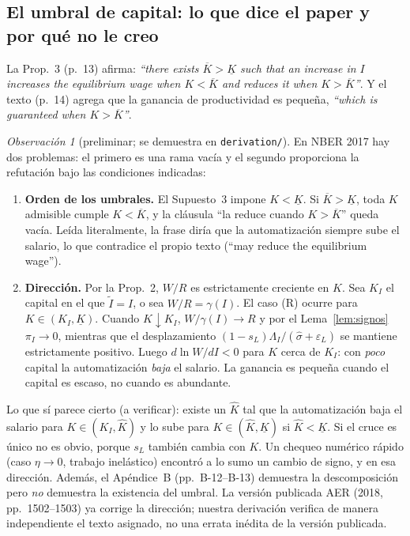 \documentclass[11pt,a4paper]{article}
\theoremstyle{definition}
\theoremstyle{plain}
\theoremstyle{remark}
\newtheorem{observacion}[definicion]{Observación}
\numberwithin{equation}{section}
\newcommand{\sh}{\hat\sigma}
\newcommand{\It}{\tilde I}
\newcommand{\Kl}{\underline K}
\newcommand{\Kb}{\overline K}
\newcommand{\eps}{\varepsilon}
\begin{document}
\subsection{El umbral de capital: lo que dice el paper y por qué no le creo}
La Prop.~3 (p.~13) afirma: \emph{``there exists $\Kb>\Kl$ such that an increase in $I$ increases the equilibrium wage
when $K<\Kb$ and reduces it when $K>\Kb$''}. Y el texto (p.~14) agrega que la ganancia de productividad es pequeña,
\emph{``which is guaranteed when $K>\Kb$''}.

\begin{observacion}[preliminar; se demuestra en \texttt{derivation/}]\label{obs:umbral}
En NBER 2017 hay dos problemas: el primero es una rama vacía y el segundo proporciona la refutación bajo las condiciones indicadas:
\begin{enumerate}[nosep]
  \item \textbf{Orden de los umbrales.} El Supuesto~3 impone $K<\Kl$. Si $\Kb>\Kl$, toda $K$ admisible cumple $K<\Kb$,
        y la cláusula ``la reduce cuando $K>\Kb$'' queda vacía. Leída literalmente, la frase diría que la
        automatización siempre sube el salario, lo que contradice el propio texto (``may reduce the equilibrium wage'').
  \item \textbf{Dirección.} Por la Prop.~2, $W/R$ es estrictamente creciente en $K$. Sea $K_I$ el capital en el que
        $\It=I$, o sea $W/R=\gamma(I)$. El caso (R) ocurre para $K\in(K_I,\Kl)$. Cuando $K\downarrow K_I$,
        $W/\gamma(I)\to R$ y por el Lema~\ref{lem:signos} $\pi_I\to0$, mientras que el desplazamiento
        $(1-s_L)\Lambda_I/(\sh+\eps_L)$ se mantiene estrictamente positivo. Luego $d\ln W/dI<0$ para $K$ cerca de $K_I$:
        con \emph{poco} capital la automatización \emph{baja} el salario. La ganancia es pequeña cuando el capital es
        escaso, no cuando es abundante.
\end{enumerate}
Lo que sí parece cierto (a verificar): existe un $\hat K$ tal que la automatización baja el salario para
$K\in(K_I,\hat K)$ y lo sube para $K\in(\hat K,\Kl)$ si $\hat K<\Kl$. Si el cruce es único no es obvio, porque $s_L$
también cambia con $K$. Un chequeo numérico rápido (caso $\eta\to0$, trabajo inelástico) encontró a lo sumo un cambio
de signo, y en esa dirección. Además, el Apéndice~B (pp.~B-12–B-13) demuestra la descomposición pero \emph{no}
demuestra la existencia del umbral. La versión publicada AER (2018, pp.~1502--1503) ya corrige la dirección; nuestra derivación verifica de manera independiente el texto asignado, no una errata inédita de la versión publicada.
\end{observacion}
\end{document}
